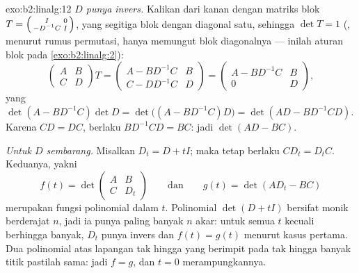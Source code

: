 \begin{solution}{exo:b2:linalg:12}
\emph{$D$ punya invers.} Kalikan dari kanan dengan matriks blok
$T = \begin{psmallmatrix} I & 0\\ -D^{-1}C & I\end{psmallmatrix}$,
yang segitiga blok dengan diagonal satu, sehingga $\det T = 1$
(, menurut rumus permutasi, hanya memungut blok
diagonalnya --- inilah aturan blok pada \cref{exo:b2:linalg:2}):
\[
\begin{pmatrix} A & B\\ C & D\end{pmatrix} T
= \begin{pmatrix} A - BD^{-1}C & B\\ C - DD^{-1}C & D\end{pmatrix}
= \begin{pmatrix} A - BD^{-1}C & B\\ 0 & D\end{pmatrix},
\]
yang  $\det(A - BD^{-1}C)\det D = \det\bigl((A -
BD^{-1}C)D\bigr) = \det(AD - BD^{-1}CD)$. Karena $CD = DC$, berlaku
$BD^{-1}CD = BC$: jadi  $\det(AD - BC)$.

\emph{Untuk $D$ sembarang.} Misalkan $D_t = D + tI$; maka tetap berlaku
$CD_t = D_tC$. Keduanya, yakni
\[
f(t) = \det\begin{pmatrix} A & B\\ C & D_t\end{pmatrix}
\qquad\text{dan}\qquad
g(t) = \det(AD_t - BC)
\]
merupakan fungsi polinomial dalam $t$. Polinomial $\det(D + tI)$
bersifat monik berderajat $n$, jadi ia punya paling banyak $n$ akar:
untuk semua $t$ kecuali berhingga banyak, $D_t$ punya invers dan $f(t) =
g(t)$ menurut kasus pertama. Dua polinomial atas lapangan tak hingga
yang berimpit pada tak hingga banyak titik pastilah sama: jadi $f = g$,
dan $t = 0$ merampungkannya.
\end{solution}

